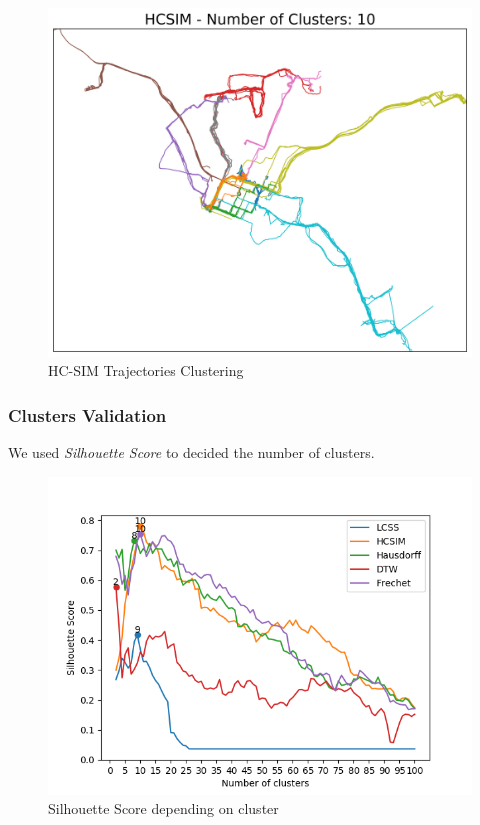 \documentclass[a4paper, 12pt]{article}
\begin{document}
\begin{figure}[htbp!]
    \centering
    \includegraphics[width=1\textwidth]{hcsim_trajectory_clustering.png}
    \caption{HC-SIM Trajectories Clustering}
    \label{fig24}
\end{figure}

\pagebreak

\subsubsection{Clusters Validation}

We used \textit{Silhouette Score} to decided the number of clusters.

\begin{figure}[htbp!]
    \centering
    \includegraphics[width=1\textwidth]{distance_compare.png}
    \caption{Silhouette Score depending on cluster}
    \label{fig25}
\end{figure}
\end{document}
